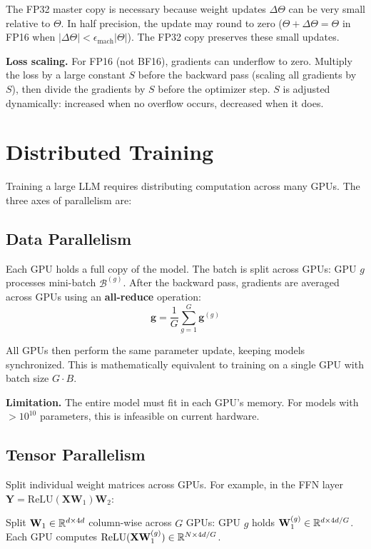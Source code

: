 \documentclass[main.tex]{subfiles}
\begin{document}
The FP32 master copy is necessary because weight updates $\Delta\Theta$ can be very small relative to $\Theta$. In half precision, the update may round to zero ($\Theta + \Delta\Theta = \Theta$ in FP16 when $|\Delta\Theta| < \epsilon_{\text{mach}}|\Theta|$). The FP32 copy preserves these small updates.

\textbf{Loss scaling.} For FP16 (not BF16), gradients can underflow to zero. Multiply the loss by a large constant $S$ before the backward pass (scaling all gradients by $S$), then divide the gradients by $S$ before the optimizer step. $S$ is adjusted dynamically: increased when no overflow occurs, decreased when it does.

\needspace{0.33\textheight}
\section{Distributed Training}

Training a large LLM requires distributing computation across many GPUs. The three axes of parallelism are:

\subsection{Data Parallelism}

Each GPU holds a full copy of the model. The batch is split across GPUs: GPU $g$ processes mini-batch $\mathcal{B}^{(g)}$. After the backward pass, gradients are averaged across GPUs using an \textbf{all-reduce} operation:
$$\mathbf{g} = \frac{1}{G}\sum_{g=1}^{G}\mathbf{g}^{(g)}$$

All GPUs then perform the same parameter update, keeping models synchronized. This is mathematically equivalent to training on a single GPU with batch size $G \cdot B$.

\textbf{Limitation.} The entire model must fit in each GPU's memory. For models with $>10^{10}$ parameters, this is infeasible on current hardware.

\subsection{Tensor Parallelism}

Split individual weight matrices across GPUs. For example, in the FFN layer $\mathbf{Y} = \text{ReLU}(\mathbf{X}\mathbf{W}_1)\mathbf{W}_2$:

Split $\mathbf{W}_1 \in \mathbb{R}^{d \times 4d}$ column-wise across $G$ GPUs: GPU $g$ holds $\mathbf{W}_1^{(g)} \in \mathbb{R}^{d \times 4d/G}$. Each GPU computes $\text{ReLU}(\mathbf{X}\mathbf{W}_1^{(g)}) \in \mathbb{R}^{N \times 4d/G}$.
\end{document}
